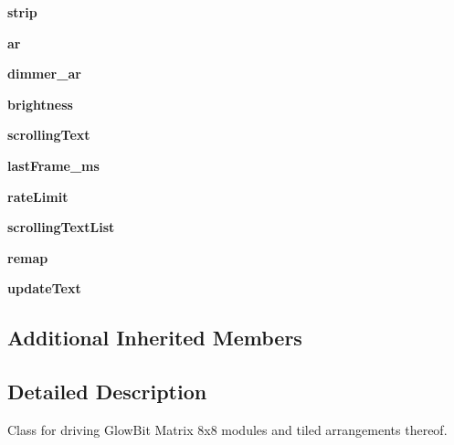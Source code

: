 \begin{DoxyCompactItemize}
{\bfseries strip}
\item 
\mbox{\label{classglowbit_1_1matrix8x8_af41df10fb7fe285edcf2a7a4677854cc}} 
{\bfseries ar}
\item 
\mbox{\label{classglowbit_1_1matrix8x8_a018d52a73e4f3902ca3272ae1e6f552c}} 
{\bfseries dimmer\+\_\+ar}
\item 
\mbox{\label{classglowbit_1_1matrix8x8_a4d227ae72c97ff008677711fc3274104}} 
{\bfseries brightness}
\item 
\mbox{\label{classglowbit_1_1matrix8x8_abaee6a53b3a15537cb75133abc6edb22}} 
{\bfseries scrolling\+Text}
\item 
\mbox{\label{classglowbit_1_1matrix8x8_a9f9e4c792c4420744234f8c400f1dc54}} 
{\bfseries last\+Frame\+\_\+ms}
\item 
\mbox{\label{classglowbit_1_1matrix8x8_a04e1bdcc67b521246610c68f5dafaa3e}} 
{\bfseries rate\+Limit}
\item 
\mbox{\label{classglowbit_1_1matrix8x8_af0afcefd1ec2dc8614e5f8f7478fd36c}} 
{\bfseries scrolling\+Text\+List}
\item 
\mbox{\label{classglowbit_1_1matrix8x8_a458b71109effe56dcbb6cde442cf5657}} 
{\bfseries remap}
\item 
\mbox{\label{classglowbit_1_1matrix8x8_aad3eb346cc87f36b36eb8bc6aeb67e5f}} 
{\bfseries update\+Text}
\end{DoxyCompactItemize}
\subsection*{Additional Inherited Members}


\subsection{Detailed Description}
Class for driving Glow\+Bit Matrix 8x8 modules and tiled arrangements thereof. 

